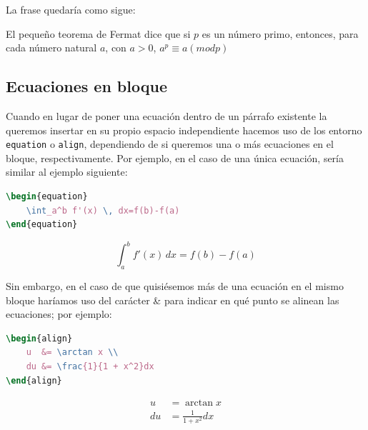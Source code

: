 \documentclass[%
    school=etsisi,%
    type=pfg,%
    degree=61CD,%
]{upm-report}
\begin{document}
La frase quedaría como sigue:

El pequeño teorema de Fermat dice que si $p$ es un número primo, entonces, para cada número natural $a$, con $a>0$, $a^p \equiv a (mod p)$

\subsection{Ecuaciones en bloque}

Cuando en lugar de poner una ecuación dentro de un párrafo existente la queremos insertar en su propio espacio independiente hacemos uso de los entorno \texttt{equation} o \texttt{align}, dependiendo de si queremos una o más ecuaciones en el bloque, respectivamente. Por ejemplo, en el caso de una única ecuación, sería similar al ejemplo siguiente:

\begin{minipage}[c]{.5\textwidth}
\begin{lstlisting}[language=tex]
\begin{equation}
	\int_a^b f'(x) \, dx=f(b)-f(a)
\end{equation}
\end{lstlisting}
\end{minipage}%
\begin{minipage}[c]{.5\textwidth}
\begin{equation}
    \int_a^b f'(x) \, dx=f(b)-f(a)
\end{equation}
\end{minipage}

Sin embargo, en el caso de que quisiésemos más de una ecuación en el mismo bloque haríamos uso del carácter \& para indicar en qué punto se alinean las ecuaciones; por ejemplo:

\begin{minipage}[c]{.5\textwidth}
\begin{lstlisting}[language=tex]
\begin{align}
    u  &= \arctan x \\ 
    du &= \frac{1}{1 + x^2}dx
\end{align}
\end{lstlisting}
\end{minipage}%
\begin{minipage}[c]{.5\textwidth}
\begin{align}
    u  &= \arctan x \\ 
    du &= \frac{1}{1 + x^2}dx
\end{align}
\end{minipage}
\end{document}
